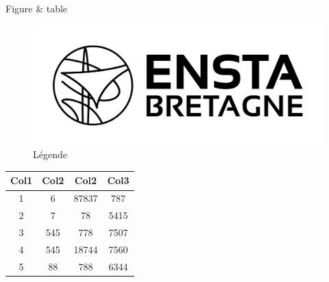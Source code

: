 \documentclass{beamer}
\begin{document}
\begin{frame}{Figure \& table}
\begin{figure}[htbp]
	\centering
	\includegraphics[width=.5\linewidth]{images/ensta-noir.png}
	\caption{Légende}
\end{figure}

\begin{center}
	\begin{tabular}{c c c c} 
		\toprule
		Col1 & Col2 & Col2 & Col3 \\\midrule 
		1 & 6 & 87837 & 787 \\ 
		2 & 7 & 78 & 5415 \\
		3 & 545 & 778 & 7507 \\
		4 & 545 & 18744 & 7560 \\
		5 & 88 & 788 & 6344 \\\bottomrule
	\end{tabular}
\end{center}
\end{frame}
\end{document}
